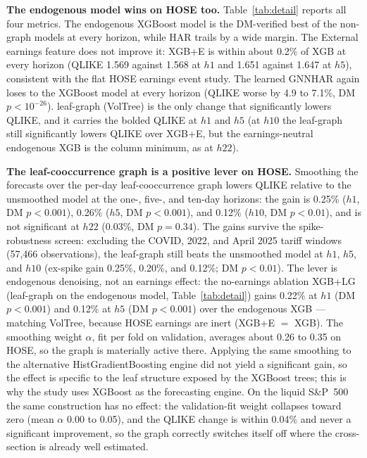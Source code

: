 \documentclass[runningheads]{llncs}
\begin{document}
\textbf{The endogenous model wins on HOSE too.} Table~\ref{tab:detail} reports all four
metrics. The endogenous XGBoost model is the DM-verified best of the non-graph models at every
horizon, while HAR trails by a wide margin. The External earnings feature does not improve it:
XGB+E is within about 0.2\% of XGB at every horizon (QLIKE 1.569 against 1.568 at $h1$ and 1.651
against 1.647 at $h5$), consistent with the flat HOSE earnings event study. The learned GNNHAR again
loses to the XGBoost model at every horizon (QLIKE worse by 4.9 to 7.1\%, DM $p<10^{-26}$).
leaf-graph (VolTree) is the only change that significantly lowers QLIKE, and it carries the bolded
QLIKE at $h1$ and $h5$ (at $h10$ the leaf-graph still significantly lowers QLIKE over XGB+E, but the
earnings-neutral endogenous XGB is the column minimum, as at $h22$).

\textbf{The leaf-cooccurrence graph is a positive lever on HOSE.} Smoothing the forecasts over the
per-day leaf-cooccurrence graph lowers QLIKE relative to the unsmoothed model at the one-, five-, and
ten-day horizons: the gain is 0.25\% ($h1$, DM $p<0.001$), 0.26\% ($h5$, DM $p<0.001$), and 0.12\%
($h10$, DM $p<0.01$), and is not significant at $h22$ (0.03\%, DM $p=0.34$).
The gains survive the spike-robustness screen: excluding the COVID, 2022, and April 2025 tariff windows
(57{,}466 observations), the leaf-graph still beats the unsmoothed model at $h1$, $h5$, and $h10$
(ex-spike gain 0.25\%, 0.20\%, and 0.12\%; DM $p<0.01$).
The lever is endogenous denoising, not an earnings effect: the no-earnings ablation XGB+LG (leaf-graph on
the endogenous model, Table~\ref{tab:detail}) gains 0.22\%
at $h1$ (DM $p<0.001$) and 0.12\% at $h5$ (DM $p<0.001$) over the endogenous XGB --- matching VolTree,
because HOSE earnings are inert (XGB+E $=$ XGB).
The smoothing weight $\alpha$, fit per fold on validation, averages about 0.26 to 0.35 on HOSE, so the
graph is materially active there. Applying the same smoothing to the alternative HistGradientBoosting
engine did not yield a significant gain, so the effect is specific to the leaf structure exposed by the
XGBoost trees; this is why the study uses XGBoost as the forecasting engine. On the liquid S\&P~500 the
same construction has no effect: the validation-fit weight collapses toward zero (mean $\alpha$ 0.00 to
0.05), and the QLIKE change is within 0.04\% and never a significant improvement, so the graph
correctly switches itself off where the cross-section is already well estimated.
\end{document}
